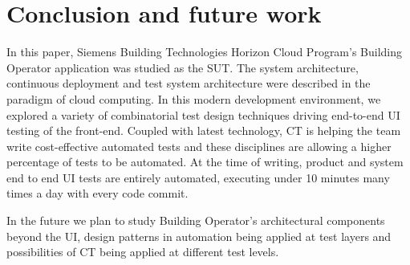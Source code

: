 \documentclass[conference]{IEEEtran}
\begin{document}
\section{Conclusion and future work}
In this paper, Siemens Building Technologies Horizon Cloud Program’s Building Operator application was studied as the SUT.
The system architecture, continuous deployment and test system architecture were described in the paradigm of cloud computing.
In this modern development environment, we explored a variety of combinatorial test design techniques driving end-to-end UI testing of the front-end.
Coupled with latest technology, CT is helping the team write cost-effective automated tests and these disciplines are allowing a higher percentage of tests to be automated.
At the time of writing, product and system end to end UI tests are entirely automated, executing under 10 minutes many times a day with every code commit.

In the future we plan to study Building Operator's architectural components beyond the UI, design patterns in automation being applied at test layers and possibilities of CT being applied at different test levels. 



\end{document}
